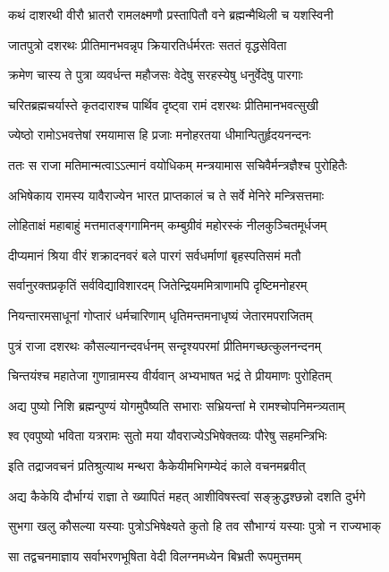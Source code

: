 \twolineshloka
{कथं दाशरथी वीरौ भ्रातरौ रामलक्ष्मणौ}
{प्रस्तापितौ वने ब्रह्मन्मैथिली च यशस्विनी}



\twolineshloka
{जातपुत्रो दशरथः प्रीतिमानभवन्नृप}
{क्रियारतिर्धर्मरतः सततं वृद्धसेविता}


\twolineshloka
{क्रमेण चास्य ते पुत्रा व्यवर्धन्त महौजसः}
{वेदेषु सरहस्येषु धनुर्वेदेषु पारगाः}


\twolineshloka
{चरितब्रह्मचर्यास्ते कृतदाराश्च पार्थिव}
{दृष्ट्वा रामं दशरथः प्रीतिमानभवत्सुखी}


\twolineshloka
{ज्येष्ठो रामोऽभवत्तेषां रमयामास हि प्रजाः}
{मनोहरतया धीमान्पितुर्हृदयनन्दनः}


\twolineshloka
{ततः स राजा मतिमान्मत्वाऽऽत्मानं वयोधिकम्}
{मन्त्रयामास सचिवैर्मन्त्रज्ञैश्च पुरोहितैः}


\twolineshloka
{अभिषेकाय रामस्य यावैराज्येन भारत}
{प्राप्तकालं च ते सर्वे मेनिरे मन्त्रिसत्तमाः}


\twolineshloka
{लोहिताक्षं महाबाहुं मत्तमातङ्गगामिनम्}
{कम्बुग्रीवं महोरस्कं नीलकुञ्चितमूर्धजम्}


\twolineshloka
{दीप्यमानं श्रिया वीरं शक्रादनवरं बले}
{पारगं सर्वधर्माणां बृहस्पतिसमं मतौ}


\twolineshloka
{सर्वानुरक्तप्रकृतिं सर्वविद्याविशारदम्}
{जितेन्द्रियममित्राणामपि दृष्टिमनोहरम्}


\twolineshloka
{नियन्तारमसाधूनां गोप्तारं धर्मचारिणाम्}
{धृतिमन्तमनाधृष्यं जेतारमपराजितम्}


\twolineshloka
{पुत्रं राजा दशरथः कौसल्यानन्दवर्धनम्}
{सन्दृश्यपरमां प्रीतिमगच्छत्कुलनन्दनम्}


\twolineshloka
{चिन्तयंश्च महातेजा गुणान्रामस्य वीर्यवान्}
{अभ्यभाषत भद्रं ते प्रीयमाणः पुरोहितम्}


\twolineshloka
{अद्य पुष्यो निशि ब्रह्मन्पुण्यं योगमुपैष्यति}
{सभाराः सभ्रियन्तां मे रामश्चोपनिमन्त्र्यताम्}


\twolineshloka
{श्व एवपुष्यो भविता यत्ररामः सुतो मया}
{यौवराज्येऽभिषेक्तव्यः पौरेषु सहमन्त्रिभिः}


\twolineshloka
{इति तद्राजवचनं प्रतिश्रुत्याथ मन्थरा}
{कैकेयीमभिगम्येदं काले वचनमब्रवीत्}


\twolineshloka
{अद्य कैकेयि दौर्भाग्यं राज्ञा ते ख्यापितं महत्}
{आशीविषस्त्वां सङ्क्रुद्धश्छन्नो दशति दुर्भगे}


\twolineshloka
{सुभगा खलु कौसल्या यस्याः पुत्रोऽभिषेक्ष्यते}
{कुतो हि तव सौभाग्यं यस्याः पुत्रो न राज्यभाक्}


\twolineshloka
{सा तद्वचनमाज्ञाय सर्वाभरणभूषिता}
{वेदी विलग्नमध्येन बिभ्रती रूपमुत्तमम्}


